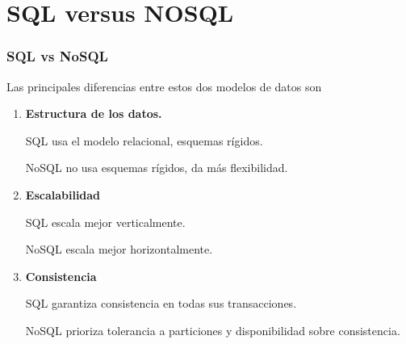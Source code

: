 \section{SQL versus NOSQL}

\begin{frame}
    \frametitle{SQL vs NoSQL}

    Las principales diferencias entre estos dos modelos de datos son

     

    \begin{enumerate}
        \item \textbf{Estructura de los datos.}

        SQL usa el modelo relacional, esquemas rígidos.

        NoSQL no usa esquemas rígidos, da más flexibilidad.

         
        
        \item \textbf{Escalabilidad}

        SQL escala mejor verticalmente.

        NoSQL escala mejor horizontalmente.

         
                
        \item \textbf{Consistencia}

        SQL garantiza consistencia en todas sus transacciones.

        NoSQL prioriza tolerancia a particiones y disponibilidad sobre consistencia.
        
    \end{enumerate}
\end{frame}